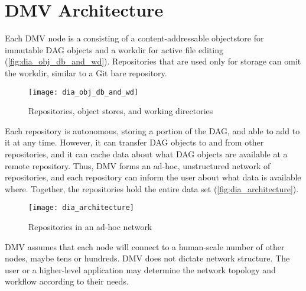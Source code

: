 \chapter{DMV Architecture}

Each \gls{DMV} node is a  consisting of a
content-addressable \gls{objectstore} for immutable \gls{DAG} objects and a
\gls{workdir} for active file editing (\autoref{fig:dia_obj_db_and_wd}).
Repositories that are used only for storage can omit the \gls{workdir}, similar
to a Git bare repository.

\begin{figure}[h]
  \centering
    \texttt{[image: dia\_obj\_db\_and\_wd]}
  \caption{Repositories, object stores, and working directories}
  \label{fig:dia_obj_db_and_wd}
\end{figure}

Each repository is autonomous, storing a portion of the \gls{DAG}, and able to
add to it at any time. However, it can transfer \gls{DAG} objects to and from
other repositories, and it can cache data about what \gls{DAG} objects are
available at a remote repository. Thus, \gls{DMV} forms an ad-hoc, unstructured
network of repositories, and each repository can inform the user about what data
is available where. Together, the repositories hold the entire data set
(\autoref{fig:dia_architecture}).

\begin{figure}[h]
  \centering
    \texttt{[image: dia\_architecture]}
  \caption{Repositories in an ad-hoc network}
  \label{fig:dia_architecture}
\end{figure}

\gls{DMV} assumes that each node will connect to a human-scale number of other
nodes, maybe tens or hundreds. \gls{DMV} does not dictate network structure. The
user or a higher-level application may determine the network topology and
workflow according to their needs.
